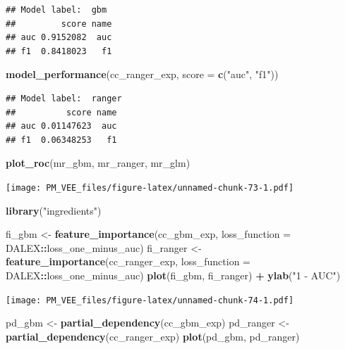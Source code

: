 \documentclass[12pt,]{krantz}
\newenvironment{Shaded}{\begin{snugshade}}{\end{snugshade}}
\newcommand{\DataTypeTok}[1]{\textcolor[rgb]{0.13,0.29,0.53}{#1}}
\newcommand{\KeywordTok}[1]{\textcolor[rgb]{0.13,0.29,0.53}{\textbf{#1}}}
\newcommand{\NormalTok}[1]{#1}
\newcommand{\OperatorTok}[1]{\textcolor[rgb]{0.81,0.36,0.00}{\textbf{#1}}}
\newcommand{\StringTok}[1]{\textcolor[rgb]{0.31,0.60,0.02}{#1}}
\begin{document}
\begin{verbatim}
## Model label:  gbm 
##         score name
## auc 0.9152082  auc
## f1  0.8418023   f1
\end{verbatim}

\begin{Shaded}
\begin{Highlighting}[]
\KeywordTok{model_performance}\NormalTok{(cc_ranger_exp, }\DataTypeTok{score =} \KeywordTok{c}\NormalTok{(}\StringTok{"auc"}\NormalTok{, }\StringTok{"f1"}\NormalTok{))}
\end{Highlighting}
\end{Shaded}

\begin{verbatim}
## Model label:  ranger 
##          score name
## auc 0.01147623  auc
## f1  0.06348253   f1
\end{verbatim}

\begin{Shaded}
\begin{Highlighting}[]
\KeywordTok{plot_roc}\NormalTok{(mr_gbm, mr_ranger, mr_glm)}
\end{Highlighting}
\end{Shaded}

\texttt{[image: PM\_VEE\_files/figure-latex/unnamed-chunk-73-1.pdf]}

\begin{Shaded}
\begin{Highlighting}[]
\KeywordTok{library}\NormalTok{(}\StringTok{"ingredients"}\NormalTok{)}

\NormalTok{fi_gbm <-}\StringTok{ }\KeywordTok{feature_importance}\NormalTok{(cc_gbm_exp, }\DataTypeTok{loss_function =}\NormalTok{ DALEX}\OperatorTok{::}\NormalTok{loss_one_minus_auc)}
\NormalTok{fi_ranger <-}\StringTok{ }\KeywordTok{feature_importance}\NormalTok{(cc_ranger_exp, }\DataTypeTok{loss_function =}\NormalTok{ DALEX}\OperatorTok{::}\NormalTok{loss_one_minus_auc)}
\KeywordTok{plot}\NormalTok{(fi_gbm, fi_ranger) }\OperatorTok{+}\StringTok{ }\KeywordTok{ylab}\NormalTok{(}\StringTok{"1 - AUC"}\NormalTok{)}
\end{Highlighting}
\end{Shaded}

\texttt{[image: PM\_VEE\_files/figure-latex/unnamed-chunk-74-1.pdf]}

\begin{Shaded}
\begin{Highlighting}[]
\NormalTok{pd_gbm <-}\StringTok{ }\KeywordTok{partial_dependency}\NormalTok{(cc_gbm_exp)}
\NormalTok{pd_ranger <-}\StringTok{ }\KeywordTok{partial_dependency}\NormalTok{(cc_ranger_exp)}
\KeywordTok{plot}\NormalTok{(pd_gbm, pd_ranger)}
\end{Highlighting}
\end{Shaded}
\end{document}
